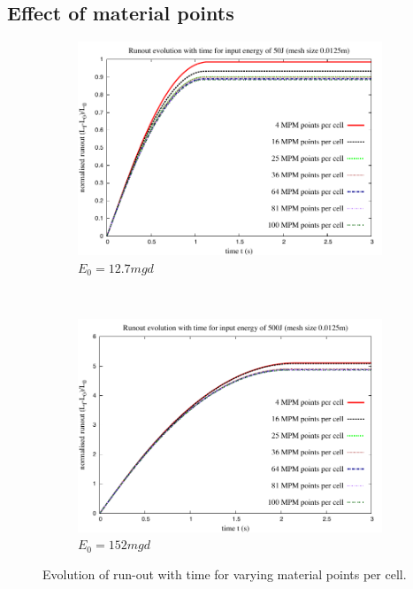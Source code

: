 \subsection{Effect of material points}
\label{sec:MPM_points_per_cell}
\begin{figure}[tbhp]
\centering
\begin{subfigure}[b]{0.95\textwidth}
\includegraphics[width=\textwidth]{Runout_50}
\caption{$E_0=12.7mgd$}
\label{fig:Runout_50}
\end{subfigure}
\\
\begin{subfigure}[b]{0.95\textwidth}
\centering
\includegraphics[width=\textwidth]{Runout_500}
\caption{$E_0=152mgd$}
\label{fig:Runout_500}
\end{subfigure}
\caption{Evolution of run-out with time for varying material points per cell.}
\label{fig:Runout_MPM}
\end{figure}



